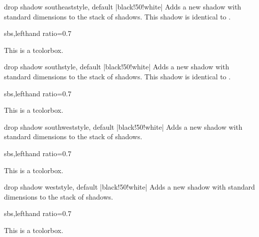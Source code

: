\begin{docTcbKey}{drop shadow southeast}{}{style, default |black!50!white|}
  Adds a new shadow with standard dimensions to the stack of shadows.
  This shadow is identical to .
\begin{dispExample*}{sbs,lefthand ratio=0.7}
\begin{tcolorbox}[drop shadow southeast,
  enhanced,colback=red!5!white,colframe=red!75!black]
  This is a tcolorbox.
\end{tcolorbox}
\end{dispExample*}
\end{docTcbKey}%

\begin{docTcbKey}{drop shadow south}{}{style, default |black!50!white|}
  Adds a new shadow with standard dimensions to the stack of shadows.
  This shadow is identical to .
\begin{dispExample*}{sbs,lefthand ratio=0.7}
\begin{tcolorbox}[drop shadow south,
  enhanced,colback=red!5!white,colframe=red!75!black]
  This is a tcolorbox.
\end{tcolorbox}
\end{dispExample*}
\end{docTcbKey}%

\begin{docTcbKey}{drop shadow southwest}{}{style, default |black!50!white|}
  Adds a new shadow with standard dimensions to the stack of shadows.
\begin{dispExample*}{sbs,lefthand ratio=0.7}
\begin{tcolorbox}[drop shadow southwest,
  enhanced,colback=red!5!white,colframe=red!75!black]
  This is a tcolorbox.
\end{tcolorbox}
\end{dispExample*}
\end{docTcbKey}%

\begin{docTcbKey}{drop shadow west}{}{style, default |black!50!white|}
  Adds a new shadow with standard dimensions to the stack of shadows.
\begin{dispExample*}{sbs,lefthand ratio=0.7}
\begin{tcolorbox}[drop shadow west,
  enhanced,colback=red!5!white,colframe=red!75!black]
  This is a tcolorbox.
\end{tcolorbox}
\end{dispExample*}
\end{docTcbKey}%

